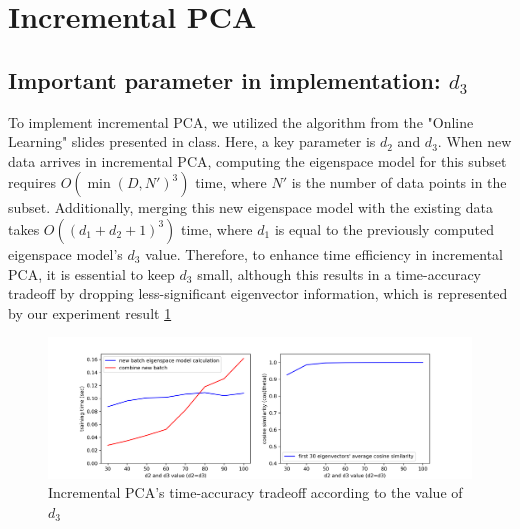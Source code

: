 \section{Incremental PCA}
\label{sec:intro}

\subsection{Important parameter in implementation: $d_3$}
To implement incremental PCA, we utilized the algorithm from the "Online Learning" slides presented in class. Here, a key parameter is $d_2$ and $d_3$. When new data arrives in incremental PCA, computing the eigenspace model for this subset requires $O(\min(D, N')^3)$ time, where $N'$ is the number of data points in the subset. Additionally, merging this new eigenspace model with the existing data takes $O((d_1 + d_2 + 1)^3)$ time, where $d_1$ is equal to the previously computed eigenspace model's $d_3$ value. Therefore, to enhance time efficiency in incremental PCA, it is essential to keep $d_3$ small, although this results in a time-accuracy tradeoff by dropping less-significant eigenvector information, which is represented by our experiment result \cref{fig:q2-fig5}

\begin{figure}[t]
	\centering
	\includegraphics[width=\linewidth]{image/q2-fig5.png}
	
	\caption{Incremental PCA's time-accuracy tradeoff according to the value of $d_3$}
	\label{fig:q2-fig5}
\end{figure}

